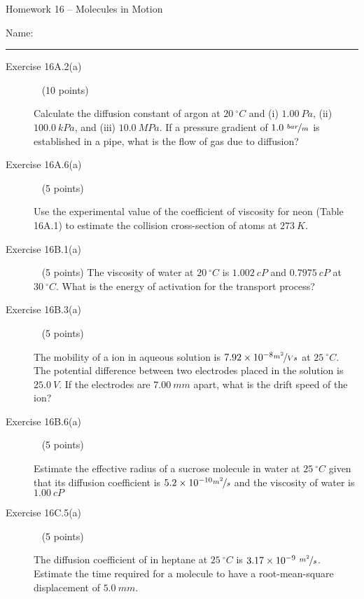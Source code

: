 \documentclass[12pt, openany, letterpaper]{memoir}
\begin{document}
\begin{center}
	{\large Homework 16 -- Molecules in Motion}
\end{center}

Name: \rule[-.1mm]{15em}{0.1pt}

\begin{description}
	\item [Exercise 16A.2(a)] ~ (10 points)

	      Calculate the diffusion constant of argon at $20~^\circ C$ and (i) $1.00~Pa$, (ii) $100.0~kPa$, and (iii) $10.0~MPa$. If a pressure gradient of $1.0~\nicefrac{bar}{m}$ is established in a pipe, what is the flow of gas due to diffusion?


	      \vspace{19em}
	\item [Exercise 16A.6(a)] ~ (5 points)

	      Use the experimental value of the coefficient of viscosity for neon (Table 16A.1) to estimate the collision cross-section of  atoms at $273~K$.

	      \vspace{20em}
	\item [Exercise 16B.1(a)] ~ (5 points)
	      The viscosity of water at $20~^\circ C$ is $1.002~cP$ and $0.7975~cP$ at $30~^\circ C$. What is the energy of activation for the transport process?

	      \vspace{23em}
	\item [Exercise 16B.3(a)] ~ (5 points)

	      The mobility of a  ion in aqueous solution is $7.92\times10^{-8}\nicefrac{m^2}{Vs}$ at $25~^\circ C$. The potential difference between two electrodes placed in the solution is $25.0~V$. If the electrodes are $7.00~mm$ apart, what is the drift speed of the  ion?

	      \vspace{23em}
	\item [Exercise 16B.6(a)] ~ (5 points)

	      Estimate the effective radius of a sucrose molecule in water at $25~^\circ C$ given that its diffusion coefficient is $5.2\times10^{-10}\nicefrac{m^2}{s}$ and the viscosity of water is $1.00~cP$

	      \vspace{23em}
	\item [Exercise 16C.5(a)] ~ (5 points)

	      The diffusion coefficient of  in heptane at $25~^\circ C$ is $3.17\times10^{-9}~\nicefrac{m^2}{s}$. Estimate the time required for a  molecule to have a root-mean-square displacement of $5.0~mm$.


\end{description}
\end{document}
